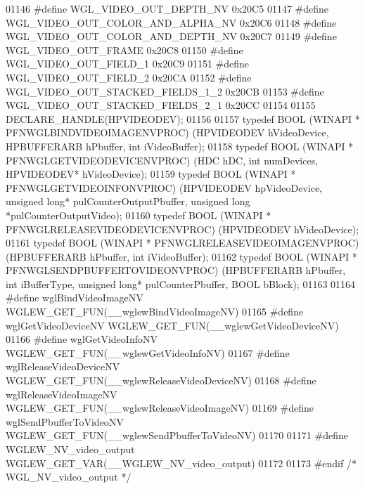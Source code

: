 \begin{DoxyCode}
01146 \textcolor{preprocessor}{#define WGL\_VIDEO\_OUT\_DEPTH\_NV 0x20C5}
01147 \textcolor{preprocessor}{#define WGL\_VIDEO\_OUT\_COLOR\_AND\_ALPHA\_NV 0x20C6}
01148 \textcolor{preprocessor}{#define WGL\_VIDEO\_OUT\_COLOR\_AND\_DEPTH\_NV 0x20C7}
01149 \textcolor{preprocessor}{#define WGL\_VIDEO\_OUT\_FRAME 0x20C8}
01150 \textcolor{preprocessor}{#define WGL\_VIDEO\_OUT\_FIELD\_1 0x20C9}
01151 \textcolor{preprocessor}{#define WGL\_VIDEO\_OUT\_FIELD\_2 0x20CA}
01152 \textcolor{preprocessor}{#define WGL\_VIDEO\_OUT\_STACKED\_FIELDS\_1\_2 0x20CB}
01153 \textcolor{preprocessor}{#define WGL\_VIDEO\_OUT\_STACKED\_FIELDS\_2\_1 0x20CC}
01154 
01155 DECLARE_HANDLE(HPVIDEODEV);
01156 
01157 \textcolor{keyword}{typedef} BOOL (WINAPI * PFNWGLBINDVIDEOIMAGENVPROC) (HPVIDEODEV hVideoDevice, 
      HPBUFFERARB hPbuffer, \textcolor{keywordtype}{int} iVideoBuffer);
01158 \textcolor{keyword}{typedef} BOOL (WINAPI * PFNWGLGETVIDEODEVICENVPROC) (HDC hDC, \textcolor{keywordtype}{int} numDevices, HPVIDEODEV* 
      hVideoDevice);
01159 \textcolor{keyword}{typedef} BOOL (WINAPI * PFNWGLGETVIDEOINFONVPROC) (HPVIDEODEV hpVideoDevice, \textcolor{keywordtype}{unsigned} \textcolor{keywordtype}{long}* 
      pulCounterOutputPbuffer, \textcolor{keywordtype}{unsigned} \textcolor{keywordtype}{long} *pulCounterOutputVideo);
01160 \textcolor{keyword}{typedef} BOOL (WINAPI * PFNWGLRELEASEVIDEODEVICENVPROC) (HPVIDEODEV hVideoDevice);
01161 \textcolor{keyword}{typedef} BOOL (WINAPI * PFNWGLRELEASEVIDEOIMAGENVPROC) (HPBUFFERARB hPbuffer, \textcolor{keywordtype}{int} 
      iVideoBuffer);
01162 \textcolor{keyword}{typedef} BOOL (WINAPI * PFNWGLSENDPBUFFERTOVIDEONVPROC) (HPBUFFERARB hPbuffer, \textcolor{keywordtype}{int} 
      iBufferType, \textcolor{keywordtype}{unsigned} \textcolor{keywordtype}{long}* pulCounterPbuffer, BOOL bBlock);
01163 
01164 \textcolor{preprocessor}{#define wglBindVideoImageNV WGLEW\_GET\_FUN(\_\_wglewBindVideoImageNV)}
01165 \textcolor{preprocessor}{#define wglGetVideoDeviceNV WGLEW\_GET\_FUN(\_\_wglewGetVideoDeviceNV)}
01166 \textcolor{preprocessor}{#define wglGetVideoInfoNV WGLEW\_GET\_FUN(\_\_wglewGetVideoInfoNV)}
01167 \textcolor{preprocessor}{#define wglReleaseVideoDeviceNV WGLEW\_GET\_FUN(\_\_wglewReleaseVideoDeviceNV)}
01168 \textcolor{preprocessor}{#define wglReleaseVideoImageNV WGLEW\_GET\_FUN(\_\_wglewReleaseVideoImageNV)}
01169 \textcolor{preprocessor}{#define wglSendPbufferToVideoNV WGLEW\_GET\_FUN(\_\_wglewSendPbufferToVideoNV)}
01170 
01171 \textcolor{preprocessor}{#define WGLEW\_NV\_video\_output WGLEW\_GET\_VAR(\_\_WGLEW\_NV\_video\_output)}
01172 
01173 \textcolor{preprocessor}{#endif }\textcolor{comment}{/* WGL\_NV\_video\_output */}\textcolor{preprocessor}{}

\end{DoxyCode}
